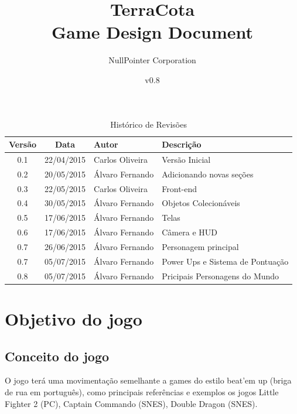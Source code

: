 \documentclass[12pt]{article}
\begin{document}
\title{TerraCota\\Game Design Document}
\author{NullPointer Corporation}
\date{v0.8}
\maketitle

\newpage

\begin{table}[h]
  \centering
  \begin{tabular}{ccll}
    \toprule
    \textbf{Versão} & \textbf{Data} & \textbf{Autor} & \textbf{Descrição} \\
    \midrule
    0.1 & 22/04/2015 & Carlos Oliveira  & Versão Inicial \\
    \rowcolor[gray]{0.9}
    0.2 & 20/05/2015 & Álvaro Fernando & Adicionando novas seções \\
    0.3 & 22/05/2015 & Carlos Oliveira & Front-end \\
    \rowcolor[gray]{0.9}
    0.4 & 30/05/2015 & Álvaro Fernando & Objetos Colecionáveis \\
    0.5 & 17/06/2015 & Álvaro Fernando & Telas \\
    \rowcolor[gray]{0.9}
    0.6 & 17/06/2015 & Álvaro Fernando & Câmera e HUD \\
    0.7 & 26/06/2015 & Álvaro Fernando & Personagem principal \\
    \rowcolor[gray]{0.9}
    0.7 & 05/07/2015 & Álvaro Fernando & Power Ups e Sistema de Pontuação \\
    0.8 & 05/07/2015 & Álvaro Fernando & Pricipais Personagens do Mundo \\
    \bottomrule
  \end{tabular}
  \caption{Histórico de Revisões}
\end{table}

\newpage

\tableofcontents

\newpage

\listoffigures

\newpage
\section{Objetivo do jogo}

\subsection{Conceito do jogo}
O jogo terá uma movimentação semelhante a games do estilo beat'em up (briga de
rua em português), como principais referências e exemplos os jogos Little
Fighter 2 (PC), Captain Commando (SNES), Double Dragon (SNES).
\end{document}
